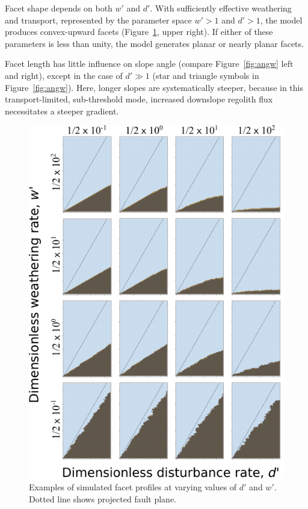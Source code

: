 Facet shape depends on both $w'$ and $d'$. With sufficiently effective weathering and transport, represented by the parameter space $w'>1$ and $d'>1$, the model produces convex-upward facets (Figure~\ref{fig:dwprofiles}, upper right). If either of these parameters is less than unity, the model generates planar or nearly planar facets.

Facet length has little influence on slope angle (compare Figure~\ref{fig:angw} left and right), except in the case of $d'\gg 1$ (star and triangle symbols in Figure~\ref{fig:angw}). Here, longer slopes are systematically steeper, because in this transport-limited, sub-threshold mode, increased downslope regolith flux necessitates a steeper gradient.

\begin{figure}[ht!]
\centerline{\includegraphics[scale=1.5]{Figures/four_by_four_profiles_in_d-w_space.pdf}}
\caption{Examples of simulated facet profiles at varying values of $d'$ and $w'$. Dotted line shows projected fault plane.}
\label{fig:dwprofiles}
\end{figure}

